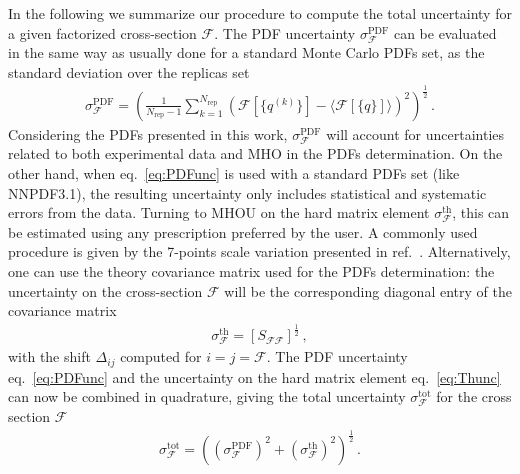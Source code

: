     In the following we summarize our procedure to compute the total uncertainty for a given factorized
    cross-section $\mathcal{F}$.
    The PDF uncertainty $\sigma_{\mathcal{F}}^{\text{PDF}}$ can be evaluated in the same way as usually done
    for a standard Monte Carlo PDFs set, as the standard deviation over the replicas set
    \begin{align}
        \label{eq:PDFunc}
        \sigma_{\mathcal{F}}^{\text{PDF}} = 
        \left(\frac{1}{N_{\text{rep}}-1} \sum_{k=1}^{N_{\text{rep}}}
        \left(\mathcal{F}\left[\{q^{(k)}\}\right]-\langle \mathcal{F}\left[\{q\}\right] \rangle\right)^2
         \right)^{\frac{1}{2}}\,.
    \end{align}
    Considering the PDFs presented in this work, $\sigma_{\mathcal{F}}^{\text{PDF}}$ will account for
    uncertainties related to both experimental data and MHO in the PDFs determination.
    On the other hand, when eq.~\eqref{eq:PDFunc} is used with a standard PDFs set (like NNPDF3.1), the resulting
    uncertainty only includes statistical and systematic errors from the data. 
    Turning to MHOU on the hard matrix element $\sigma_{\mathcal{F}}^{\text{th}}$,
    this can be estimated using any prescription preferred by the user.
    A commonly used procedure is given by the 7-points scale variation presented in ref.~\cite{deFlorian:2016spz}.
    Alternatively, one can use the theory covariance matrix used for the PDFs determination: the uncertainty 
    on the cross-section $\mathcal{F}$ will be the corresponding diagonal entry of the covariance matrix
    \begin{align}
        \label{eq:Thunc}
        \sigma_{\mathcal{F}}^{\text{th}} = \left[S_{\mathcal{F}\mathcal{F}}\right]^{\frac{1}{2}}\,,
    \end{align} 
    with the shift $\Delta_{ij}$ computed for $i=j = \mathcal{F}$.
    The PDF uncertainty eq.~\eqref{eq:PDFunc} and the uncertainty on the hard matrix element eq.~\eqref{eq:Thunc}
    can now be combined in quadrature, giving the total uncertainty $\sigma_{\mathcal{F}}^{\text{tot}}$
    for the cross section $\mathcal{F}$
    \begin{align}
        \label{eq:TOTunc}
        \sigma_{\mathcal{F}}^{\text{tot}} 
        = \left(\left(\sigma_{\mathcal{F}}^{\text{PDF}}\right)^2 +
        \left(\sigma_{\mathcal{F}}^{\text{th}}\right)^2\right)^{\frac{1}{2}}\,.
    \end{align}



    

    
    